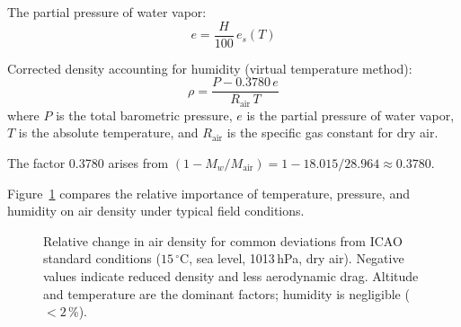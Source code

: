 \documentclass[11pt,twoside,openright]{report}
\begin{document}
The partial pressure of water vapor:
\begin{equation}
  e = \frac{H}{100}\, e_s(T)
\end{equation}

Corrected density accounting for humidity (virtual temperature method):
\begin{equation}
  \rho = \frac{P - 0.3780\,e}{R_{\mathrm{air}}\,T}
  \label{eq:rho_humid}
\end{equation}
where $P$ is the total barometric pressure, $e$ is the partial pressure of water vapor, $T$ is the absolute temperature, and $R_{\mathrm{air}}$ is the specific gas constant for dry air.

The factor 0.3780 arises from $(1 - M_w/M_{\mathrm{air}}) = 1 - 18.015/28.964 \approx 0.3780$.

Figure~\ref{fig:density_sensitivity} compares the relative importance of temperature, pressure, and humidity on air density under typical field conditions.

\begin{figure}[H]
\centering
{}
\caption{Relative change in air density for common deviations from ICAO standard conditions ($15\,^\circ$C, sea level, 1013\,hPa, dry air). Negative values indicate reduced density and less aerodynamic drag. Altitude and temperature are the dominant factors; humidity is negligible ($< 2$\,\%).}
\label{fig:density_sensitivity}
\end{figure}
\end{document}
